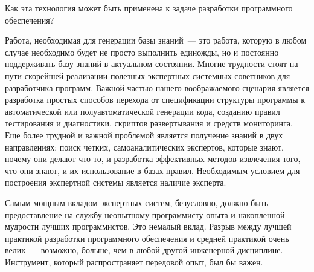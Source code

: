 Как эта технология может быть применена к задаче разработки программного
обеспечения?

Работа, необходимая для генерации базы знаний\ --- это работа, которую в любом
случае необходимо будет не просто выполнить единожды, но и постоянно
поддерживать базу знаний в актуальном состоянии. Многие трудности стоят на пути
скорейшей реализации полезных экспертных системных советников для разработчика
программ. Важной частью нашего воображаемого сценария является разработка
простых способов перехода от спецификации структуры программы к автоматической
или полуавтоматической генерации кода, созданию правил тестирования и
диагностики, скриптов развертывания и средств мониторинга. Еще более трудной и
важной проблемой является получение знаний в двух направлениях: поиск четких,
самоаналитических экспертов, которые знают, почему они делают что-то, и
разработка эффективных методов извлечения того, что они знают, и их
использование в базах правил. Необходимым условием для построения экспертной
системы является наличие эксперта.

Самым мощным вкладом экспертных систем, безусловно, должно быть предоставление
на службу неопытному программисту опыта и накопленной мудрости лучших
программистов. Это немалый вклад. Разрыв между лучшей практикой разработки
программного обеспечения и средней практикой очень велик\ --- возможно, больше,
чем в любой другой инженерной дисциплине. Инструмент, который распространяет
передовой опыт, был бы важен.

